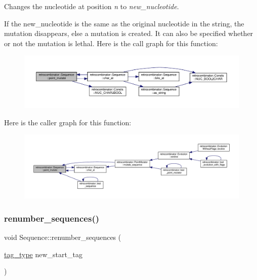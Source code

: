 Changes the nucleotide at position {\itshape n} to {\itshape new\+\_\+nucleotide}. 

If the new\+\_\+nucleotide is the same as the original nucleotide in the string, the mutation disappears, else a mutation is created. It can also be specified whether or not the mutation is lethal. Here is the call graph for this function\+:
\nopagebreak
\begin{figure}[H]
\begin{center}
\leavevmode
\includegraphics[width=350pt]{classretrocombinator_1_1Sequence_a85299c3dbf2efb993a43acc2e42fcb00_cgraph}
\end{center}
\end{figure}
Here is the caller graph for this function\+:
\nopagebreak
\begin{figure}[H]
\begin{center}
\leavevmode
\includegraphics[width=350pt]{classretrocombinator_1_1Sequence_a85299c3dbf2efb993a43acc2e42fcb00_icgraph}
\end{center}
\end{figure}
\mbox{\label{classretrocombinator_1_1Sequence_ad4791ec3cefbea417081cd349ac6c23b}} 
\subsubsection{\texorpdfstring{renumber\+\_\+sequences()}{renumber\_sequences()}}
{\footnotesize\ttfamily void Sequence\+::renumber\+\_\+sequences (\begin{DoxyParamCaption}\item[{\hyperlink{constants_8h_afd7c6eb4293e8c4d12827609a9a34b9b}{tag\+\_\+type}}]{new\+\_\+start\+\_\+tag }\end{DoxyParamCaption})\hspace{0.3cm}{\ttfamily [static]}}



